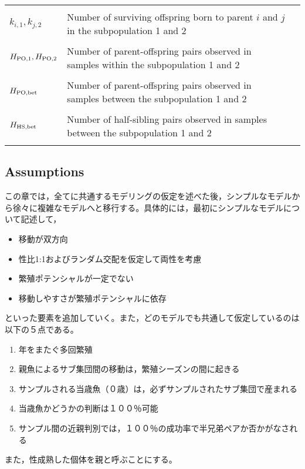 \documentclass[AMA,STIX1COL]{WileyNJD-v2}
\begin{document}
\begin{table}[tb]
\begin{center}
\begin{tabular}{llc}
		                						& \\
	$k_{i,1}, k_{j,2}$					& Number of surviving offspring born to parent $i$ and $j$ in the subpopulation 1 and 2\\ 
	                							& \\
	$H_{\rm PO, 1}, H_{\rm PO, 2}$		& Number of parent-offspring pairs observed in samples within the subpopulation 1 and 2\\ 
	                							& \\
	$H_{\rm PO, bet}$					& Number of parent-offspring pairs observed in samples between the subpopulation 1 and 2\\ 
	                							& \\
	$H_{\rm HS, bet}$					& Number of half-sibling pairs observed in samples between the subpopulation 1 and 2\\ 
	                							& \\              		
	\hline
    \end{tabular}
    \label{symbols} 
\end{center} 
\end{table}
\renewcommand{\arraystretch}{1}

\subsection{Assumptions}

この章では，全てに共通するモデリングの仮定を述べた後，シンプルなモデルから徐々に複雑なモデルへと移行する。具体的には，最初にシンプルなモデルについて記述して，
\begin{itemize}
  \item 移動が双方向
  \item 性比1:1およびランダム交配を仮定して両性を考慮
  \item 繁殖ポテンシャルが一定でない
  \item 移動しやすさが繁殖ポテンシャルに依存
\end{itemize}
といった要素を追加していく。また，どのモデルでも共通して仮定しているのは以下の５点である。
\begin{enumerate}
  \item 年をまたぐ多回繁殖
  \item 親魚によるサブ集団間の移動は，繁殖シーズンの間に起きる
  \item サンプルされる当歳魚（０歳）は，必ずサンプルされたサブ集団で産まれる
  \item 当歳魚かどうかの判断は１００％可能
  \item サンプル間の近親判別では，１００％の成功率で半兄弟ペアか否かがなされる
\end{enumerate}
また，性成熟した個体を親と呼ぶことにする。
\end{document}
